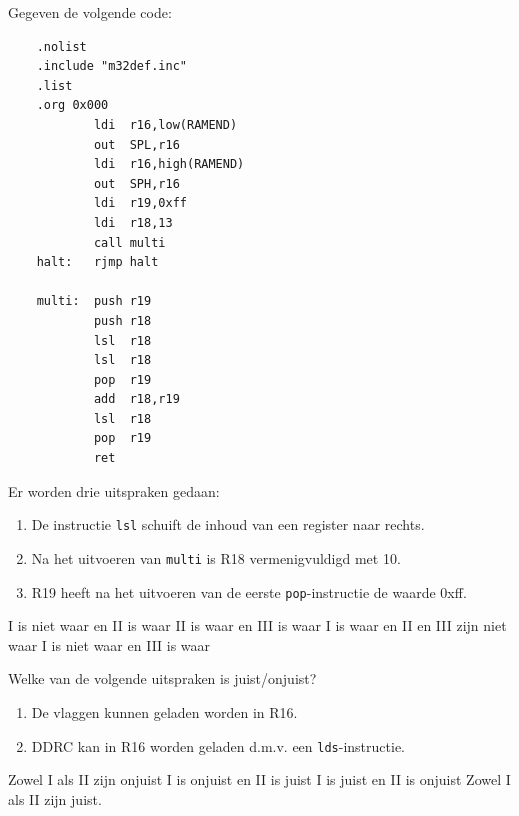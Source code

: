 \documentclass[a4paper,12pt,fleqn,dutch]{tisdexam}
\begin{document}
\begin{questions}
\question
\label{opg:opg19}
Gegeven de volgende code:
\begin{verbatim}
    .nolist
    .include "m32def.inc"
    .list
    .org 0x000
            ldi  r16,low(RAMEND)
            out  SPL,r16
            ldi  r16,high(RAMEND)
            out  SPH,r16
            ldi  r19,0xff
            ldi  r18,13
            call multi
    halt:   rjmp halt

    multi:  push r19
            push r18
            lsl  r18
            lsl  r18
            pop  r19
            add  r18,r19
            lsl  r18
            pop  r19
            ret
\end{verbatim}
\newpage
Er worden drie uitspraken gedaan:
\begin{enumerate}[itemsep=-1pt,leftmargin=23pt,label=\Roman*.]
\item De instructie \texttt{lsl} schuift de inhoud van een register naar rechts.
\item Na het uitvoeren van \texttt{multi} is R18 vermenigvuldigd met 10.
\item R19 heeft na het uitvoeren van de eerste \texttt{pop}-instructie de waarde 0x{f}{f}.
\end{enumerate}
\begin{choices}
	\CorrectChoice \label{ans:opg19} I is niet waar en II is waar
	\choice II is waar en III is waar
	\choice I is waar en II en III zijn niet waar
	\choice I is niet waar en III is waar
\end{choices}


\question
\label{opg:opg20}
Welke van de volgende uitspraken is juist/onjuist?
\begin{enumerate}[itemsep=-1pt,leftmargin=23pt,label=\Roman*.]
	\item De vlaggen kunnen geladen worden in R16.
	\item DDRC kan in R16 worden geladen d.m.v. een \texttt{lds}-instructie.
\end{enumerate}
\begin{choices}
	\choice Zowel I als II zijn onjuist
	\choice I is onjuist en II is juist
	\choice I is juist en II is onjuist
	\CorrectChoice \label{ans:opg20} Zowel I als II zijn juist.
\end{choices}



\end{questions}
\end{document}
